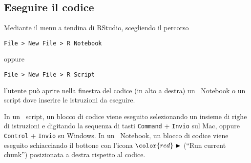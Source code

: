 \subsection{Eseguire il codice}

Mediante il menu a tendina di RStudio, scegliendo il percorso 
\begin{lstlisting}
File > New File > R Notebook
\end{lstlisting}
oppure 
\begin{lstlisting}
File > New File > R Script
\end{lstlisting}
l'utente può aprire nella finestra del codice (in alto a destra) un \R\, Notebook o un \R\, script  dove inserire le istruzioni da eseguire.

In un \R\, script, un blocco di codice viene eseguito selezionando un insieme di righe di istruzioni e digitando la sequenza di tasti \verb|Command| + \verb|Invio| sul Mac, oppure \verb|Control| + \verb|Invio| su Windows.
In un \R\, Notebook, un blocco di codice viene eseguito schiacciando il bottone con l'icona  $ \color{red}\blacktriangleright$ (\enquote{Run current chunk}) posizionata a destra rispetto al codice.



